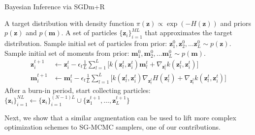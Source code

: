 \begin{algorithm}[ht] %
\caption{Bayesian Inference via SGDm+R}  
\label{alg:alg2}
\begin{algorithmic}
 A target distribution with density function $\pi(\bm{z}) \propto \exp (-H(\bm{z}))$ and priors $p(\bm{z})$ and $p(\bm{m})$.
 A set of particles $\{\bm{z}_i\}_{i=1}^{ML}$ that approximates the target distribution.  
\State Sample initial set of particles from prior: $\bm{z}_1^0, \bm{z}_2^0, \ldots \bm{z}_L^0 \sim p(\bm{z})$.
\State Sample initial set of moments from prior: $\bm{m}_1^0, \bm{m}_2^0, \ldots \bm{m}_L^0 \sim p(\bm{m})$.
\State 
\begin{align*} 
\bm{z}_i^{t+1}  &\gets  \bm{z}_i^t - \epsilon_t \frac{1}{L}\sum_{l=1}^L\big[  k(\bm{z}_l^t, \bm{z}_i^t)  \bm{m}_l^t + \nabla_{\bm{z}_l^t} k(\bm{z}_l^t, \bm{z}_i^t)\big] \\
\bm{m}_i^{t+1}  &\gets  \bm{m}_i^t - \epsilon_t \frac{1}{L}\sum_{l=1}^L\big[  k(\bm{z}_l^t, \bm{z}_i^t)  \nabla_{\bm{z}_l^t} H(\bm{z}_l^t) + \nabla_{\bm{z}_l^t} k(\bm{z}_l^t, \bm{z}_i^t)\big] %
\end{align*}
\State After a burn-in period, start collecting particles: $ \{\bm{z}_i\}_{i=1}^{NL} \gets \{\bm{z}_i\}_{i=1}^{(N-1)L} \cup \{ \bm{z}_1^{t+1}, \ldots,  \bm{z}_L^{t+1} \} $ 
\EndFor
\end{algorithmic}
\end{algorithm}

Next, we show that a similar augmentation can be used to lift more complex optimization schemes to SG-MCMC samplers, one of our contributions.

